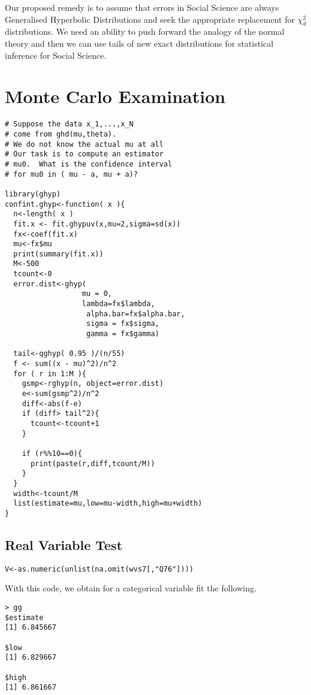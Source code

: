\documentclass{amsart}
\begin{document}
Our proposed remedy is to assume that errors in Social Science are always Generalised Hyperbolic Distributions and seek the appropriate replacement for $\chi^2_d$ distributions.  We need an ability to push forward the analogy of the normal theory and then we can use tails of new exact distributions for statistical inference for Social Science.

\section{Monte Carlo Examination}

\begin{verbatim}
# Suppose the data x_1,...,x_N
# come from ghd(mu,theta).
# We do not know the actual mu at all
# Our task is to compute an estimator
# mu0.  What is the confidence interval 
# for mu0 in ( mu - a, mu + a)?

library(ghyp)
confint.ghyp<-function( x ){
  n<-length( x )
  fit.x <- fit.ghypuv(x,mu=2,sigma=sd(x))
  fx<-coef(fit.x)
  mu<-fx$mu
  print(summary(fit.x))
  M<-500
  tcount<-0
  error.dist<-ghyp(
                  mu = 0,
                  lambda=fx$lambda,
                   alpha.bar=fx$alpha.bar,
                   sigma = fx$sigma,
                   gamma = fx$gamma)

  tail<-qghyp( 0.95 )/(n/55)
  f <- sum((x - mu)^2)/n^2
  for ( r in 1:M ){
    gsmp<-rghyp(n, object=error.dist)
    e<-sum(gsmp^2)/n^2
    diff<-abs(f-e)
    if (diff> tail^2){
      tcount<-tcount+1
    }
    
    if (r%%10==0){
      print(paste(r,diff,tcount/M))
    }
  }
  width<-tcount/M
  list(estimate=mu,low=mu-width,high=mu+width)
}
\end{verbatim}

\subsection{Real Variable Test}

\begin{verbatim}
V<-as.numeric(unlist(na.omit(wvs7[,"Q76"])))
\end{verbatim}


With this code, we obtain for a categorical variable fit the following.

\begin{verbatim}
> gg
$estimate
[1] 6.845667

$low
[1] 6.829667

$high
[1] 6.861667
\end{verbatim}
\end{document}
